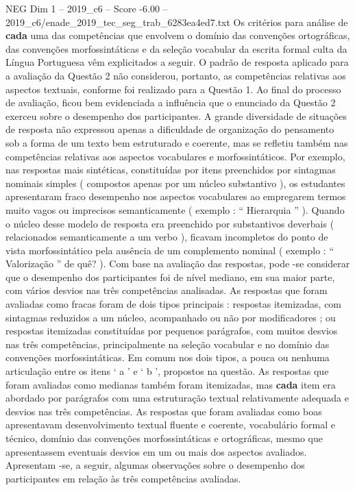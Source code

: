 \begin{textsample}{NEG Dim 1 – 2019\_c6 – Score -6.00 – 2019\_c6/enade\_2019\_tec\_seg\_trab\_6283ea4ed7.txt}
Os critérios para análise de \textbf{cada} uma das competências que envolvem o domínio das convenções ortográficas, das convenções morfossintáticas e da seleção vocabular da escrita formal culta da Língua Portuguesa vêm explicitados a seguir.
O padrão de resposta aplicado para a avaliação da Questão 2 não considerou, portanto, as competências relativas aos aspectos textuais, conforme foi realizado para a Questão 1.
Ao final do processo de avaliação, ficou bem evidenciada a influência que o enunciado da Questão 2 exerceu sobre o desempenho dos participantes.
A grande diversidade de situações de resposta não expressou apenas a dificuldade de organização do pensamento sob a forma de um texto bem estruturado e coerente, mas se refletiu também nas competências relativas aos aspectos vocabulares e morfossintáticos.
Por exemplo, nas respostas mais sintéticas, constituídas por itens preenchidos por sintagmas nominais simples ( compostos apenas por um núcleo substantivo ), os estudantes apresentaram fraco desempenho nos aspectos vocabulares ao empregarem termos muito vagos ou imprecisos semanticamente ( exemplo : “ Hierarquia ” ).
Quando o núcleo desse modelo de resposta era preenchido por substantivos deverbais ( relacionados semanticamente a um verbo ), ficavam incompletos do ponto de vista morfossintático pela ausência de um complemento nominal ( exemplo : “ Valorização ” de quê? ).
Com base na avaliação das respostas, pode -se considerar que o desempenho dos participantes foi de nível mediano, em sua maior parte, com vários desvios nas três competências analisadas.
As respostas que foram avaliadas como fracas foram de dois tipos principais : respostas itemizadas, com sintagmas reduzidos a um núcleo, acompanhado ou não por modificadores ; ou respostas itemizadas constituídas por pequenos parágrafos, com muitos desvios nas três competências, principalmente na seleção vocabular e no domínio das convenções morfossintáticas.
Em comum nos dois tipos, a pouca ou nenhuma articulação entre os itens ‘ a ’ e ‘ b ’, propostos na questão.
As respostas que foram avaliadas como medianas também foram itemizadas, mas \textbf{cada} item era abordado por parágrafos com uma estruturação textual relativamente adequada e desvios nas três competências.
As respostas que foram avaliadas como boas apresentavam desenvolvimento textual fluente e coerente, vocabulário formal e técnico, domínio das convenções morfossintáticas e ortográficas, mesmo que apresentassem eventuais desvios em um ou mais dos aspectos avaliados.
Apresentam -se, a seguir, algumas observações sobre o desempenho dos participantes em relação às três competências avaliadas.

\end{textsample}
